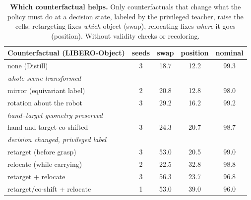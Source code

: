 \begin{table}[t]
\centering
\small
\setlength{\tabcolsep}{3.5pt}
\begin{tabular}{lcccc}
\toprule
Counterfactual (LIBERO-Object) & seeds & swap & position & nominal \\
\midrule
none (Distill) & 3 & 18.7 & 12.2 & 99.3 \\
\multicolumn{5}{l}{\emph{whole scene transformed}} \\
\quad mirror (equivariant label) & 2 & 20.8 & 12.8 & 98.0 \\
\quad rotation about the robot & 3 & 29.2 & 16.2 & 99.2 \\
\multicolumn{5}{l}{\emph{hand--target geometry preserved}} \\
\quad hand and target co-shifted & 3 & 24.3 & 20.7 & 98.7 \\
\multicolumn{5}{l}{\emph{decision changed, privileged label}} \\
\quad retarget (before grasp) & 3 & 53.0 & 20.5 & 99.0 \\
\quad relocate (while carrying) & 2 & 22.5 & 32.8 & 98.8 \\
\quad retarget + relocate & 3 & 56.3 & 23.7 & 96.8 \\
\quad retarget/co-shift + relocate & 1 & 53.0 & 39.0 & 96.0 \\
\bottomrule
\end{tabular}
\caption{\textbf{Which counterfactual helps.} Only counterfactuals that change what the policy must do at a decision state,
labeled by the privileged teacher, raise the cells: retargeting fixes \emph{which} object (swap), relocating fixes
\emph{where} it goes (position). Without validity checks or recoloring.}
\label{tab:kinds}
\end{table}

